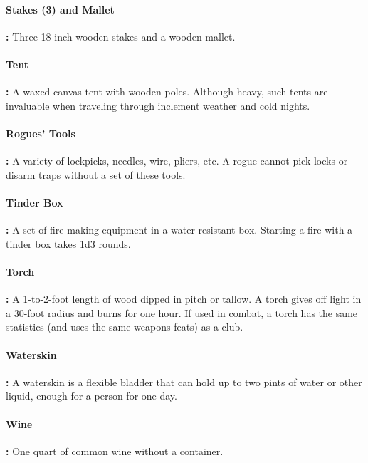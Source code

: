\begin{multicols*}{2}
\paragraph{Stakes (3) and Mallet}\textbf{:} Three 18 inch wooden stakes and a wooden mallet.

\paragraph{Tent}\textbf{:} A waxed canvas tent with wooden poles. Although heavy, such tents are invaluable when traveling through inclement weather and cold nights.

\paragraph{Rogues’ Tools}\textbf{:} A variety of lockpicks, needles, wire, pliers, etc. A rogue cannot pick locks or disarm traps without a set of these tools.

\paragraph{Tinder Box}\textbf{:} A set of fire making equipment in a water resistant box. Starting a fire with a tinder box takes 1d3 rounds.

\paragraph{Torch}\textbf{:} A 1-to-2-foot length of wood dipped in pitch or tallow. A torch gives off light in a 30-foot radius and burns for one hour. If used in combat, a torch has the same statistics (and uses the same weapons feats) as a club.

\paragraph{Waterskin}\textbf{:} A waterskin is a flexible bladder that can hold up to two pints of water or other liquid, enough for a person for one day.

\paragraph{Wine}\textbf{:} One quart of common wine without a container.


\end{multicols*}
